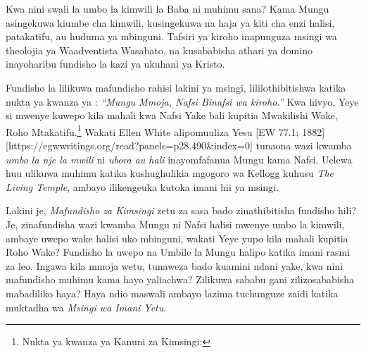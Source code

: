 Kwa nini swali la umbo la kimwili la Baba ni muhimu sana? Kama Mungu asingekuwa kiumbe cha kimwili, kusingekuwa na haja ya kiti cha enzi halisi, patakatifu, au huduma ya mbinguni. Tafsiri ya kiroho inapunguza msingi wa theolojia ya Waadventista Wasabato, na kusababisha athari ya domino inayoharibu fundisho la kazi ya ukuhani ya Kristo.

Fundisho la  lilikuwa mafundisho rahisi lakini ya msingi, lililothibitishwa katika nukta ya kwanza ya : \textit{“Mungu Mmoja, Nafsi Binafsi wa kiroho.”} Kwa hivyo, Yeye si mwenye kuwepo kila mahali kwa Nafsi Yake bali kupitia Mwakilishi Wake, Roho Mtakatifu.\footnote{Nukta ya kwanza ya Kanuni za Kimsingi: } Wakati Ellen White alipomuuliza Yesu [EW 77.1; 1882][https://egwwritings.org/read?panels=p28.490&index=0] tunaona wazi kwamba \textit{umbo la nje la mwili} ni \textit{ubora au hali} inayomfafanua Mungu kama Nafsi. Uelewa huu ulikuwa muhimu katika kushughulikia mgogoro wa Kellogg kuhusu \textit{The Living Temple}, ambayo ilikengeuka kutoka imani hii ya msingi.

Lakini je, \textit{Mafundisho za Kimsingi} zetu za sasa bado zinathibitisha fundisho hili? Je, zinafundisha wazi kwamba Mungu ni Nafsi halisi mwenye umbo la kimwili, ambaye uwepo wake halisi uko mbinguni, wakati Yeye yupo kila mahali kupitia Roho Wake? Fundisho la uwepo na Umbile la Mungu halipo katika imani rasmi za leo. Ingawa kila mmoja wetu, tunaweza bado kuamini ndani yake, kwa nini mafundisho muhimu kama hayo yaliachwa? Zilikuwa sababu gani zilizosababisha mabadiliko haya? Haya ndio maswali ambayo lazima tuchunguze zaidi katika muktadha wa \textit{Msingi wa Imani Yetu}.




